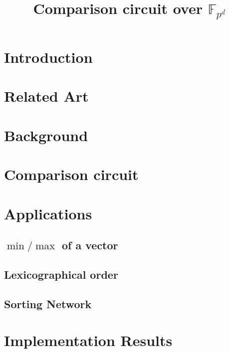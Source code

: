 \documentclass{llncs}
\title{Comparison circuit over $\mathbb{F}_{p^d}$}
\date{}
\author{}
\begin{document}
\maketitle

\section{Introduction}
\label{sec:introduction}




\section{Related Art}
\label{sec:related-art}



\section{Background}
\label{sec:background}



\section{Comparison circuit}
\label{sec:comparison-circuit}



\section{Applications}
\label{sec:applications}

\subsection{$\min/\max$ of a vector}
\label{sec:min/max}

\subsection{Lexicographical order}
\label{sec:lexic-order}

\subsection{Sorting Network}
\label{sec:sorting-network}


\section{Implementation Results}
\label{sec:impl-results}




\end{document}
